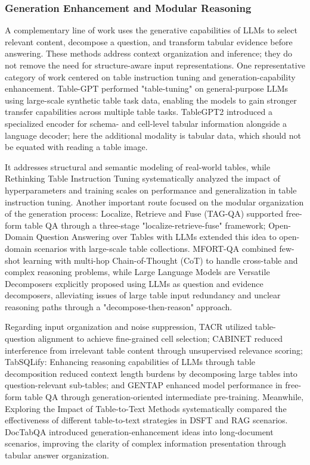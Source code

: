 \subsubsection{Generation Enhancement and Modular Reasoning}
A complementary line of work uses the generative capabilities of LLMs to select relevant content, decompose a question, and transform tabular evidence before answering. These methods address context organization and inference; they do not remove the need for structure-aware input representations. One representative category of work centered on table instruction tuning and generation-capability enhancement. Table-GPT \cite{peng2023table} performed "table-tuning" on general-purpose LLMs using large-scale synthetic table task data, enabling the models to gain stronger transfer capabilities across multiple table tasks. TableGPT2 \cite{su2024tablegpt2} introduced a specialized encoder for schema- and cell-level tabular information alongside a language decoder; here the additional modality is tabular data, which should not be equated with reading a table image.

It addresses structural and semantic modeling of real-world tables, while Rethinking Table Instruction Tuning \cite{deng2025rethinking} systematically analyzed the impact of hyperparameters and training scales on performance and generalization in table instruction tuning. Another important route focused on the modular organization of the generation process: Localize, Retrieve and Fuse (TAG-QA) \cite{zhao2023localize} supported free-form table QA through a three-stage "localize-retrieve-fuse" framework; Open-Domain Question Answering over Tables with LLMs \cite{liang2024open} extended this idea to open-domain scenarios with large-scale table collections. MFORT-QA \cite{guan2024mfort} combined few-shot learning with multi-hop Chain-of-Thought (CoT) to handle cross-table and complex reasoning problems, while Large Language Models are Versatile Decomposers \cite{ye2023large} explicitly proposed using LLMs as question and evidence decomposers, alleviating issues of large table input redundancy and unclear reasoning paths through a "decompose-then-reason" approach.

Regarding input organization and noise suppression, TACR \cite{wu2024table} utilized table-question alignment to achieve fine-grained cell selection; CABINET \cite{patnaik2024cabinet} reduced interference from irrelevant table content through unsupervised relevance scoring; TabSQLify: Enhancing reasoning capabilities of LLMs through table decomposition \cite{nahid2024tabsqlify} reduced context length burdens by decomposing large tables into question-relevant sub-tables; and GENTAP \cite{shi2022generation} enhanced model performance in free-form table QA through generation-oriented intermediate pre-training. Meanwhile, Exploring the Impact of Table-to-Text Methods \cite{min2024exploring} systematically compared the effectiveness of different table-to-text strategies in DSFT and RAG scenarios. DocTabQA \cite{wang2024doctabqa} introduced generation-enhancement ideas into long-document scenarios, improving the clarity of complex information presentation through tabular answer organization.

